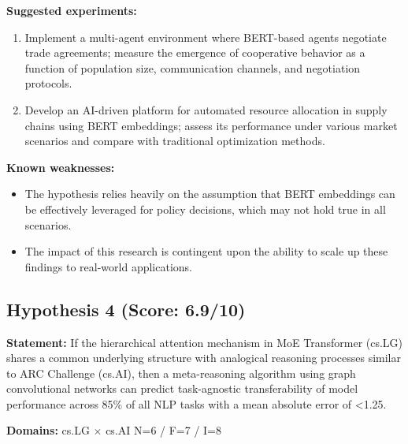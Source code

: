 \documentclass[12pt,a4paper]{article}
\begin{document}
\textbf{Suggested experiments:}
\begin{enumerate}
  \item Implement a multi-agent environment where BERT-based agents negotiate trade agreements; measure the emergence of cooperative behavior as a function of population size, communication channels, and negotiation protocols.
  \item Develop an AI-driven platform for automated resource allocation in supply chains using BERT embeddings; assess its performance under various market scenarios and compare with traditional optimization methods.
\end{enumerate}

\textbf{Known weaknesses:}
\begin{itemize}
  \item The hypothesis relies heavily on the assumption that BERT embeddings can be effectively leveraged for policy decisions, which may not hold true in all scenarios.
  \item The impact of this research is contingent upon the ability to scale up these findings to real-world applications.
\end{itemize}
\subsection*{Hypothesis 4 (Score: 6.9/10)}

\textbf{Statement:} If the hierarchical attention mechanism in MoE Transformer (cs.LG) shares a common underlying structure with analogical reasoning processes similar to ARC Challenge (cs.AI), then a meta-reasoning algorithm using graph convolutional networks can predict task-agnostic transferability of model performance across 85\% of all NLP tasks with a mean absolute error of <1.25.

\noindent\textbf{Domains:} cs.LG $\times$ cs.AI
\hspace{1em} N=6 / F=7 / I=8
\end{document}
